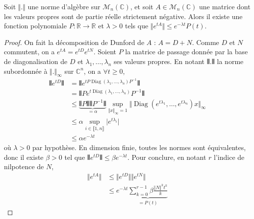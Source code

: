 






  \begin{lemma}
    \label{equation-de-sylvester-1}
    Soit $\Vert . \Vert$ une norme d'algèbre sur $\mathcal{M}_n(\mathbb{C})$, et soit $A \in \mathcal{M}_n(\mathbb{C})$ une matrice dont les valeurs propres sont de partie réelle strictement négative. Alors il existe une fonction polynomiale $P : \mathbb{R} \rightarrow \mathbb{R}$ et $\lambda > 0$ tels que $\Vert e^{tA} \Vert \leq e^{- \lambda t} P(t)$.
  \end{lemma}

  \begin{proof}
    On fait la décomposition de Dunford de $A$ : $A = D+N$. Comme $D$ et $N$ commutent, on a $e^{tA} = e^{tD} e^{tN}$. Soient $P$ la matrice de passage donnée par la base de diagonalisation de $D$ et $\lambda_1, \dots, \lambda_n$ ses valeurs propres. En notant $\VERT . \VERT$ la norme subordonnée à $\Vert . \Vert_\infty$ sur $\mathbb{C}^n$, on a $\forall t \geq 0$,
    \begin{align*}
      \VERT e^{tD} \VERT &= \VERT e^{tP \operatorname{Diag}(\lambda_1, \dots, \lambda_n) P^{-1}} \VERT \\
      & = \VERT P e^{t \operatorname{Diag}(\lambda_1, \dots, \lambda_n)} P^{-1} \VERT \\
      & \leq \underbrace{\VERT P \VERT \VERT P^{-1} \VERT}_{= \alpha} \sup_{\Vert x \Vert_\infty = 1} \Vert \operatorname{Diag}(e^{t \lambda_1}, \dots, e^{t \lambda_n}) x \Vert_{\infty} \\
      & \leq \alpha \sup_{i \in \llbracket 1, n \rrbracket} \vert e^{t\lambda_i} \vert \\
      & \leq \alpha e^{-\lambda t}
    \end{align*}
    où $\lambda > 0$ par hypothèse. En dimension finie, toutes les normes sont équivalentes, donc il existe $\beta > 0$ tel que $\VERT e^{tD} \VERT \leq \beta e^{- \lambda t}$.
    \newpar
    Pour conclure, en notant $r$ l'indice de nilpotence de $N$,
    \begin{align*}
      \Vert e^{tA} \Vert & \leq \Vert e^{tD} \Vert \Vert e^{tN} \Vert \\
      & \leq e^{- \lambda t} \underbrace{\sum_{k=0}^{r-1} \beta \frac{\Vert N \Vert^k t^k}{k}}_{= P(t)}
    \end{align*}
  \end{proof}

